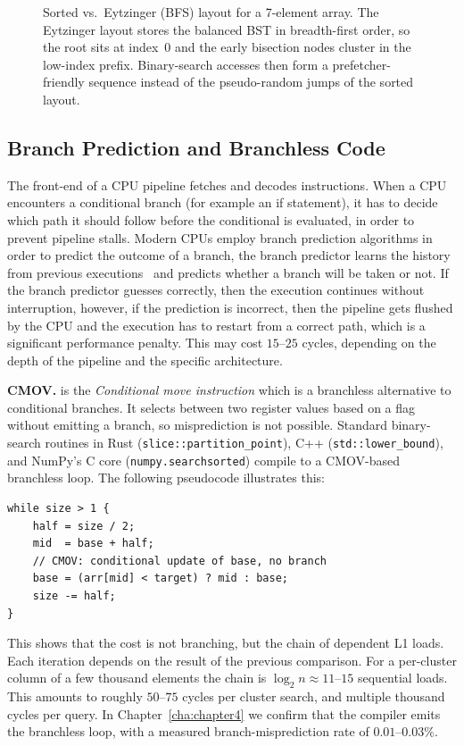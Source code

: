 \begin{figure}[h]
\begin{tikzpicture}
\end{tikzpicture}
\caption[Sorted vs.\ Eytzinger array layout.]{Sorted vs.\ Eytzinger (BFS) layout for a 7-element array. The Eytzinger layout stores the balanced BST in breadth-first order, so the root sits at index~0 and the early bisection nodes cluster in the low-index prefix. Binary-search accesses then form a prefetcher-friendly sequence instead of the pseudo-random jumps of the sorted layout.}
\label{fig:sb:eytzinger}
\end{figure}

\subsection{Branch Prediction and Branchless Code\label{sec:bg:branch}}

The front-end of a CPU pipeline fetches and decodes instructions. When a CPU encounters a conditional branch (for example an if statement), it has to decide which path it should follow before the conditional is evaluated, in order to prevent pipeline stalls. Modern CPUs employ branch prediction algorithms in order to predict the outcome of a branch, the branch predictor learns the history from previous executions~\cite{yeh_patt_1992} and predicts whether a branch will be taken or not. If the branch predictor guesses correctly, then the execution continues without interruption, however, if the prediction is incorrect, then the pipeline gets flushed by the CPU and the execution has to restart from a correct path, which is a significant performance penalty. This may cost $15$--$25$ cycles, depending on the depth of the pipeline and the specific architecture.

\textbf{CMOV.} is the \emph{Conditional move instruction} which is a branchless alternative to conditional branches. It selects between two register values based on a flag without emitting a branch, so misprediction is not possible. Standard binary-search routines in Rust (\texttt{slice::partition\_point}), C++ (\texttt{std::lower\_bound}), and NumPy's C core (\texttt{numpy.searchsorted}) compile to a CMOV-based branchless loop. The following pseudocode illustrates this:

\begin{verbatim}
while size > 1 {
    half = size / 2;
    mid  = base + half;
    // CMOV: conditional update of base, no branch
    base = (arr[mid] < target) ? mid : base;
    size -= half;
}
\end{verbatim}

This shows that the cost is not branching, but the chain of dependent L1 loads. Each iteration depends on the result of the previous comparison. For a per-cluster column of a few thousand elements the chain is $\log_2 n \approx 11$--$15$ sequential loads. This amounts to roughly $50$--$75$ cycles per cluster search, and multiple thousand cycles per query. In Chapter~\ref{cha:chapter4} we confirm that the compiler emits the branchless loop, with a measured branch-misprediction rate of $0.01$--$0.03\%$.

